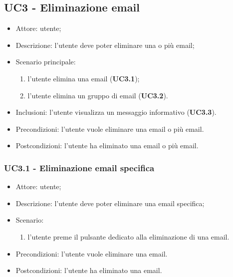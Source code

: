     \subsection{UC3 - Eliminazione email}
    \begin{itemize}
        \item Attore: utente;
        \item Descrizione: l'utente deve poter eliminare una o più email;
        \item Scenario principale:
            \begin{enumerate}
            \item l’utente elimina una email (\textbf{UC3.1});
            \item l’utente elimina un gruppo di email (\textbf{UC3.2}).
            \end{enumerate}
        \item Inclusioni: l'utente visualizza un messaggio informativo (\textbf{UC3.3}).
        \item Precondizioni: l'utente vuole eliminare una email o più email.
        \item Postcondizioni: l'utente ha eliminato una email o più email.
    \end{itemize}

    \subsubsection{UC3.1 - Eliminazione email specifica}
    \begin{itemize}
        \item Attore: utente;
        \item Descrizione: l'utente deve poter eliminare una email specifica;
        \item Scenario:
        \begin{enumerate}
        \item l'utente preme il pulsante dedicato alla eliminazione di una email.
        \end{enumerate}
        \item Precondizioni: l'utente vuole eliminare una email.
        \item Postcondizioni: l'utente ha eliminato una email.
    \end{itemize}

